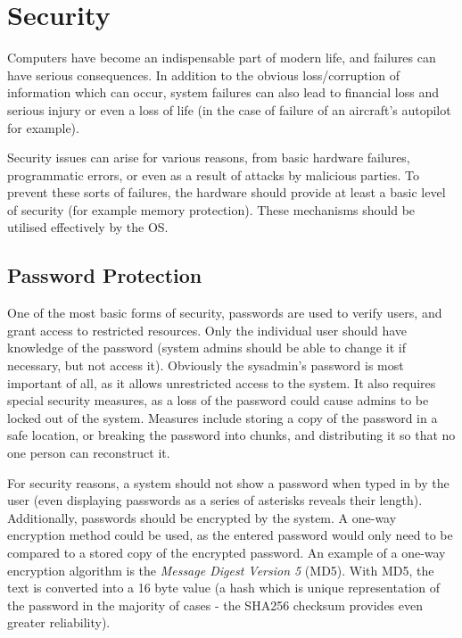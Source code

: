 \documentclass[a4paper,oneside]{report}
\begin{document}
\chapter{Security}

	Computers have become an indispensable part of modern life, and failures can have serious consequences. In addition to the obvious loss/corruption of information which can occur, system failures can also lead to financial loss and serious injury or even a loss of life (in the case of failure of an aircraft's autopilot for example).
	
	Security issues can arise for various reasons, from basic hardware failures, programmatic errors, or even as a result of attacks by malicious parties. To prevent these sorts of failures, the hardware should provide at least a basic level of security (for example memory protection). These mechanisms should be utilised effectively by the OS.
	
	\section{Password Protection} 
	
	One of the most basic forms of security, passwords are used to verify users, and grant access to restricted resources. Only the individual user should have knowledge of the password (system admins should be able to change it if necessary, but not access it). Obviously the sysadmin's password is most important of all, as it allows unrestricted access to the system. It also requires special security measures, as a loss of the password could cause admins to be locked out of the system. Measures include storing a copy of the password in a safe location, or breaking the password into chunks, and distributing it so that no one person can reconstruct it. 
	
	For security reasons, a system should not show a password when typed in by the user (even displaying passwords as a series of asterisks reveals their length). Additionally, passwords should be encrypted by the system. A one-way encryption method could be used, as the entered password would only need to be compared to a stored copy of the encrypted password. An example of a one-way encryption algorithm is the \emph{Message Digest Version 5} (MD5). With MD5, the text is converted into a 16 byte value (a hash which is unique representation of the password in the majority of cases - the SHA256 checksum provides even greater reliability).
	
\end{document}
